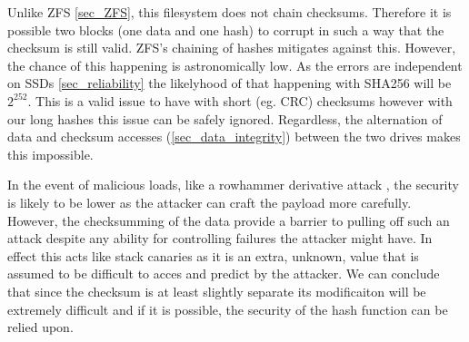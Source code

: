        Unlike ZFS \ref{sec_ZFS}, this filesystem does not chain checksums.
        Therefore it is possible two blocks (one data and one hash) to corrupt
        in such a way that the checksum is still valid. ZFS's chaining of
        hashes mitigates against this. However, the chance of this happening is
        astronomically low. As the errors are independent on SSDs
        \ref{sec_reliability} the likelyhood of that happening with SHA256
        will be $2^{252}$. This is a valid issue to have with short (eg. CRC)
        checksums however with our long hashes this issue can be safely
        ignored. Regardless, the alternation of data and checksum accesses
        (\ref{sec_data_integrity}) between the two drives makes this
        impossible.

        In the event of malicious loads, like a rowhammer derivative attack
        \cite{ssd_rowhammer}, the security is likely to be lower as the
        attacker can craft the payload more carefully. However, the
        checksumming of the data provide a barrier to pulling off such an
        attack despite any ability for controlling failures the attacker might
        have. In effect this acts like stack canaries \cite{canary} as it is
        an extra, unknown, value that is assumed to be difficult to acces and
        predict by the attacker. We can conclude that since the checksum is at
        least slightly separate its modificaiton will be extremely difficult
        and if it is possible, the security of the hash function can be relied
        upon.



